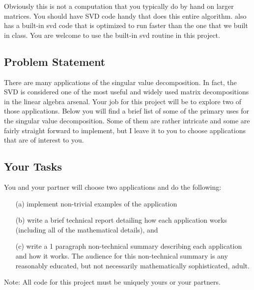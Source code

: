 Obviously this is not a computation that you typically do by hand on larger matrices.  You
should have SVD code handy that does this entire algorithm.  \ProgLang also has a built-in
svd code that is optimized to run faster than the one that we built in class.  You are
welcome to use the built-in svd \ProgLang routine in this project.

\subsection*{Problem Statement}
There are many applications of the singular value decomposition.  In fact, the SVD is
considered one of the most useful and widely used matrix decompositions in the linear
algebra arsenal.  Your job for this project will be to explore two of those applications.
Below you will find a brief list of some of the primary uses for the singular value
decomposition.  Some of them are rather intricate and some are fairly straight forward to
implement, but I leave it to you to choose applications that are of interest to you.

\subsection*{Your Tasks}
You and your partner will choose two applications and do the following:
\begin{enumerate}
    \item[(a)] implement non-trivial examples of the application 
    \item[(b)] write a brief technical report detailing how each application works
        (including all of the mathematical details), and
    \item[(c)] write a 1 paragraph non-technical summary describing
        each application and how it works.  The audience for this non-technical summary is
        any reasonably educated, but not necessarily mathematically sophisticated,
        adult.
\end{enumerate}

Note: All code for this project must be uniquely yours or your partners.  

